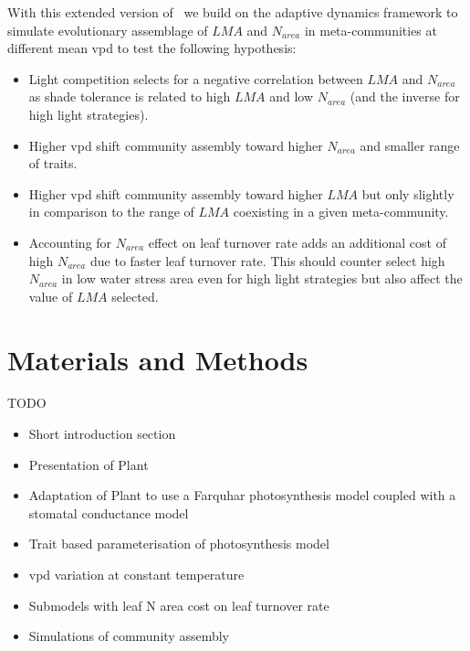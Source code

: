 \documentclass[a4paper,11pt]{article}
\begin{document}
With this extended version of \plant\ we build on the adaptive dynamics framework to simulate evolutionary assemblage of $LMA$ and $N_{area}$ in meta-communities at different mean vpd to test the following hypothesis:  
 
\begin{itemize}

\item Light competition selects for a negative correlation between $LMA$ and $N_{area}$ as shade tolerance is related to high $LMA$ and low $N_{area}$ (and the inverse for high light strategies).

\item Higher vpd shift community assembly toward higher $N_{area}$ and smaller range of traits.

\item Higher vpd shift community assembly toward higher $LMA$ but only slightly in comparison to the range of $LMA$ coexisting in a given meta-community.

\item Accounting for $N_{area}$ effect on leaf turnover rate adds an
  additional cost of high $N_{area}$ due to faster leaf turnover
  rate. This should counter select high $N_{area}$ in low water stress
  area even for high light strategies but also affect the value of $LMA$ selected.

\end{itemize}


\section{Materials and Methods}

TODO

\begin{itemize}

\item Short introduction section
  
\item Presentation of Plant

\item Adaptation of Plant to use a Farquhar photosynthesis model coupled with a stomatal conductance model

\item Trait based parameterisation of photosynthesis model

\item vpd variation at constant temperature

\item Submodels with leaf N area cost on leaf turnover rate  
  
\item Simulations of community assembly 

\end{itemize}
\end{document}
